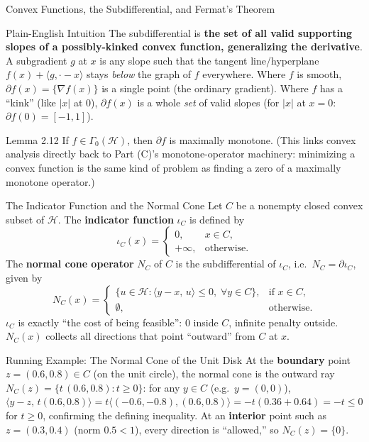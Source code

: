 \documentclass[aspectratio=169,10pt]{beamer}
\begin{document}
\begin{frame}[allowframebreaks]{Convex Functions, the Subdifferential, and Fermat's Theorem}
  \begin{block}{Plain-English Intuition}
    The subdifferential is \textbf{the set of all valid supporting slopes of
    a possibly-kinked convex function, generalizing the derivative}. A
    subgradient $g$ at $x$ is any slope such that the tangent line/hyperplane
    $f(x) + \langle g, \cdot - x\rangle$ stays \emph{below} the graph of $f$
    everywhere. Where $f$ is smooth, $\partial f(x) = \{\nabla f(x)\}$ is a
    single point (the ordinary gradient). Where $f$ has a ``kink'' (like
    $|x|$ at $0$), $\partial f(x)$ is a whole \emph{set} of valid slopes
    (for $|x|$ at $x=0$: $\partial f(0) = [-1,1]$).
  \end{block}

  \framebreak

  \begin{block}{Lemma 2.12}
    If $f \in \Gamma_0(\mathcal{H})$, then $\partial f$ is maximally
    monotone. (This links convex analysis directly back to Part (C)'s
    monotone-operator machinery: minimizing a convex function is the same
    kind of problem as finding a zero of a maximally monotone operator.)
  \end{block}

  \begin{block}{The Indicator Function and the Normal Cone}
    Let $C$ be a nonempty closed convex subset of $\mathcal{H}$. The
    \textbf{indicator function} $\iota_C$ is defined by
    \[
      \iota_C(x) = \begin{cases} 0, & x \in C, \\ +\infty, & \text{otherwise.} \end{cases}
    \]
    The \textbf{normal cone operator} $N_C$ of $C$ is the subdifferential of
    $\iota_C$, i.e.\ $N_C = \partial \iota_C$, given by
    \[
      N_C(x) = \begin{cases}
        \{u \in \mathcal{H} : \langle y-x,\, u\rangle \le 0,\; \forall y \in C\},
          & \text{if } x \in C, \\
        \emptyset, & \text{otherwise.}
      \end{cases}
    \]
    $\iota_C$ is exactly ``the cost of being feasible'': $0$ inside $C$,
    infinite penalty outside. $N_C(x)$ collects all directions that point
    ``outward'' from $C$ at $x$.
  \end{block}

  \framebreak

  \begin{exampleblock}{Running Example: The Normal Cone of the Unit Disk}
    At the \textbf{boundary} point $z = (0.6, 0.8) \in C$ (on the unit
    circle), the normal cone is the outward ray
    $N_C(z) = \{t\,(0.6,0.8) : t \ge 0\}$: for any $y \in C$ (e.g.\
    $y=(0,0)$), $\langle y - z,\, t(0.6,0.8)\rangle =
    t\langle (-0.6,-0.8),(0.6,0.8)\rangle = -t(0.36+0.64) = -t \le 0$ for
    $t \ge 0$, confirming the defining inequality. At an \textbf{interior}
    point such as $z=(0.3,0.4)$ (norm $0.5 < 1$), every direction is
    ``allowed,'' so $N_C(z) = \{0\}$.
  \end{exampleblock}


\end{frame}
\end{document}
